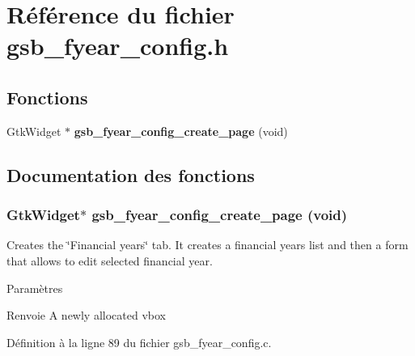 \section{Référence du fichier gsb\_\-fyear\_\-config.h}
\label{gsb__fyear__config_8h}
\subsection*{Fonctions}
\begin{DoxyCompactItemize}
\item 
GtkWidget $\ast$ {\bf gsb\_\-fyear\_\-config\_\-create\_\-page} (void)
\end{DoxyCompactItemize}


\subsection{Documentation des fonctions}
\subsubsection[{gsb\_\-fyear\_\-config\_\-create\_\-page}]{\setlength{\rightskip}{0pt plus 5cm}GtkWidget$\ast$ gsb\_\-fyear\_\-config\_\-create\_\-page (void)}\label{gsb__fyear__config_8h_a37421ef73d8d61900daa3c6c18846ed6}
Creates the \char`\"{}Financial years\char`\"{} tab. It creates a financial years list and then a form that allows to edit selected financial year.


\begin{DoxyParams}{Paramètres}
\item[{\em }]\end{DoxyParams}
\begin{DoxyReturn}{Renvoie}
A newly allocated vbox 
\end{DoxyReturn}


Définition à la ligne 89 du fichier gsb\_\-fyear\_\-config.c.

